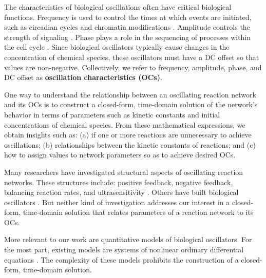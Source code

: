 \documentclass{bmcart}
\begin{document}
The characteristics of biological oscillations often have critical biological functions. Frequency is used to control the times at which events are initiated, such as circadian cycles and chromatin modifications \cite{venkatachalam2022}. Amplitude controls the strength of signaling \cite{mahrou_degradation-driven_2022}. Phase plays a role in the sequencing of processes within the cell cycle \cite{Ball2011}. Since biological oscillators typically cause changes in the concentration of chemical species, these oscillators must have a DC offset so that values are non-negative. Collectively, we refer to frequency, amplitude, phase, and DC offset as {\bf oscillation characteristics (OCs)}.


One way to understand the relationship between an oscillating reaction network and its OCs is to construct a closed-form, time-domain solution of the network's behavior in terms of parameters such as kinetic constants and initial concentrations of chemical species. From these mathematical expressions, we obtain insights such as: (a) if one or more reactions are unnecessary to achieve oscillations; (b) relationships between the kinetic constants of reactions; and (c) how to assign values to network parameters so as to achieve desired OCs.

Many researchers have investigated structural aspects of oscillating reaction networks. These structures include: positive feedback, negative feedback, balancing reaction rates, and ultrasensitivity
\cite{cao2016, Li2018, lenz_temporal_2011, HoonHa2012, tatka_cesium_2023}. Others have built biological oscillators \cite{atkinson_development_2003, Ball2011,  Elowitz2000, nakajima2005, Perry2012, rosier_how_2015,  weitz2014}. But neither kind of investigation addresses our interest in a closed-form, time-domain solution that relates parameters of a reaction network to its OCs.

More relevant to our work are quantitative models of biological oscillators. For the most part, existing models are systems of nonlinear ordinary differential equations \cite{huxley1952, Goodwin1965, heinrich1977, Goldbeter1991, rumbell_dimensions_2019, sadeghpour_bistability_2017}. The complexity of these models prohibits the construction of a closed-form, time-domain solution.
\end{document}
